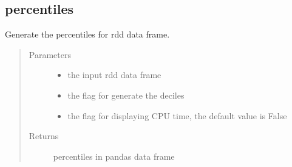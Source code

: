 \documentclass[letterpaper,12pt,english]{sphinxmanual}
\begin{document}
\subsection{percentiles}
\label{\detokenize{basics:percentiles}}

\begin{fulllineitems}
Generate the percentiles for rdd data frame.
\begin{quote}\begin{description}
\item[{Parameters}] \leavevmode\begin{itemize}
\item {} 
 \textendash{} the input rdd data frame

\item {} 
 \textendash{} the flag for generate the deciles

\item {} 
 \textendash{} the flag for displaying CPU time, the default value is False

\end{itemize}

\item[{Returns}] \leavevmode
percentiles in pandas data frame

\end{description}\end{quote}


\end{fulllineitems}
\end{document}
